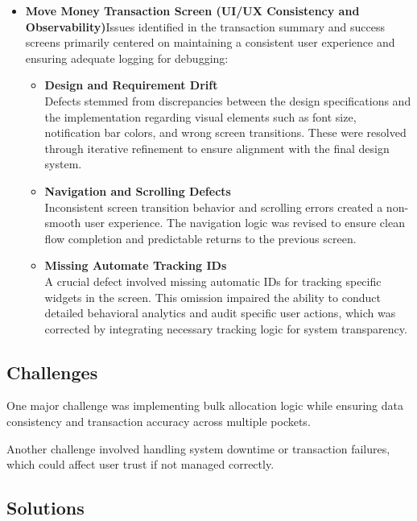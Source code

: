 \documentclass[12pt,oneside,openright,a4paper]{cpe-english-project}
\begin{document}
\begin{itemize}
\item
  \textbf{Move Money Transaction Screen (UI/UX Consistency and
  Observability)}Issues identified in the transaction summary and success screens
primarily centered on maintaining a consistent user experience and
ensuring adequate logging for debugging:


\begin{itemize}
\item
  \textbf{Design and Requirement Drift\\
  }Defects stemmed from discrepancies between the design specifications
  and the implementation regarding visual elements such as font size,
  notification bar colors, and wrong screen transitions. These were
  resolved through iterative refinement to ensure alignment with the
  final design system.
\item
  \textbf{Navigation and Scrolling Defects\\
  }Inconsistent screen transition behavior and scrolling errors created
  a non-smooth user experience. The navigation logic was revised to
  ensure clean flow completion and predictable returns to the previous
  screen.
\item
  \textbf{Missing Automate Tracking IDs\\
  }A crucial defect involved missing automatic IDs for tracking specific
  widgets in the screen. This omission impaired the ability to conduct
  detailed behavioral analytics and audit specific user actions, which
  was corrected by integrating necessary tracking logic for system
  transparency.
\end{itemize}
\end{itemize}


\subsection{Challenges}

One major challenge was implementing bulk allocation logic while
ensuring data consistency and transaction accuracy across multiple
pockets.

Another challenge involved handling system downtime or transaction
failures, which could affect user trust if not managed correctly.

\subsection{Solutions}
\end{document}

